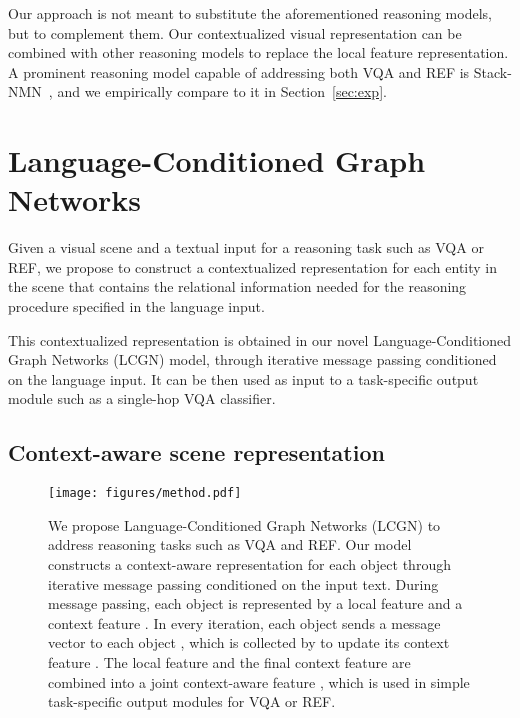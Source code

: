 \documentclass[10pt,twocolumn,letterpaper]{article}
\begin{document}
Our approach is not meant to substitute the aforementioned reasoning models, but to complement them. Our contextualized visual representation can be combined with other reasoning models to replace the local feature representation. 
A prominent reasoning model capable of addressing both VQA and REF is Stack-NMN~\cite{hu2018explainable}, and we empirically compare to it in Section~\ref{sec:exp}. 
 \section{Language-Conditioned Graph Networks}
\label{sec:method}

Given a visual scene and a textual input for a reasoning task such as VQA or REF, we propose to construct a contextualized representation for each entity in the scene that contains the relational information needed for the reasoning procedure specified in the language input. 

This contextualized representation is obtained in our novel Language-Conditioned Graph Networks (LCGN) model, through iterative message passing conditioned on the language input. It can be then used as input to a task-specific output module such as a single-hop VQA classifier.

\subsection{Context-aware scene representation}
\label{sec:method_model}

\begin{figure*}[t]
\vspace{-1.5em}
\centering
\texttt{[image: figures/method.pdf]}
\vspace{-0.5em}
\caption{We propose Language-Conditioned Graph Networks (LCGN) to address reasoning tasks such as VQA and REF. Our model constructs a context-aware representation  for each object  through iterative message passing conditioned on the input text. During message passing, each object  is represented by a local feature  and a context feature . In every iteration, each object  sends a message vector  to each object , which is collected by  to update its context feature . The local feature  and the final context feature  are combined into a joint context-aware feature , which is used in simple task-specific output modules for VQA or REF.}
\label{fig:method}
\vspace{-1em}
\end{figure*}
\end{document}
